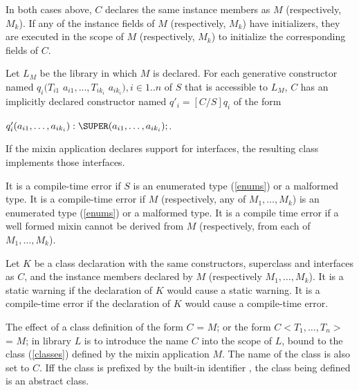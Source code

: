 \documentclass{article}
\newcommand{\code}[1]{{\sf #1}}
\begin{document}
\LMHash{}
In both cases above, $C$ declares the same instance members as $M$ (respectively, $M_k$). If any of the instance fields of $M$ (respectively, $M_k$) have initializers, they are executed in the scope of $M$ (respectively, $M_k$) to initialize the corresponding fields of $C$.

\LMHash{}
Let $L_M$ be the library in which $M$ is declared.
For each generative constructor named $q_i(T_{i1}$ $ a_{i1}, \ldots , T_{ik_i}$ $ a_{ik_i}), i \in 1..n$ of $S$ that is accessible to $L_M$, $C$ has an implicitly declared constructor named
$q'_i = [C/S]q_i$ of the form

$q'_i(a_{i1}, \ldots , a_{ik_i}):\SUPER(a_{i1}, \ldots , a_{ik_i});$.


\LMHash{}
If the mixin application declares support for interfaces, the resulting class implements those interfaces.

\LMHash{}
It is a compile-time error if $S$ is an enumerated type (\ref{enums}) or a malformed type. It is a compile-time error if $M$ (respectively, any of $M_1, \ldots, M_k$) is an enumerated type (\ref{enums}) or a malformed type. It is a compile time error if a well formed mixin cannot be derived from $M$ (respectively, from each of $M_1, \ldots, M_k$).

\LMHash{}
Let $K$ be a class declaration  with the same constructors, superclass and interfaces as $C$,  and the instance members declared by $M$ (respectively $M_1, \ldots, M_k$). It is a static warning if the declaration of $K$ would cause a static warning.  It is a compile-time error if the declaration of $K$ would cause a compile-time error.


\LMHash{}
The effect of a class definition of the form \code{\CLASS{} $C$ = $M$; } or the form \code{\CLASS{} $C<T_1, \ldots, T_n>$ = $M$; } in library $L$  is to introduce the name $C$ into the scope of $L$, bound to the class (\ref{classes}) defined by the mixin application $M$. The name of the class is also set to $C$. Iff the  class is prefixed by the built-in identifier \ABSTRACT{}, the class being defined is an abstract class.
\end{document}
